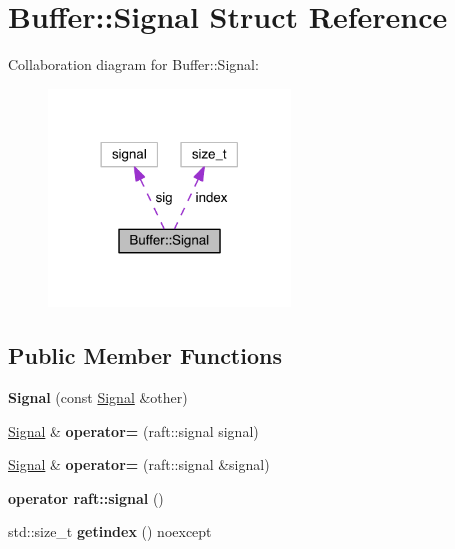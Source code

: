 \hypertarget{struct_buffer_1_1_signal}{}\section{Buffer\+:\+:Signal Struct Reference}
\label{struct_buffer_1_1_signal}


Collaboration diagram for Buffer\+:\+:Signal\+:
\nopagebreak
\begin{figure}[H]
\begin{center}
\leavevmode
\includegraphics[width=182pt]{struct_buffer_1_1_signal__coll__graph}
\end{center}
\end{figure}
\subsection*{Public Member Functions}
\begin{DoxyCompactItemize}
\item 
\hypertarget{struct_buffer_1_1_signal_a62e5d960ad4d79ac886cb33b05203d4f}{}\label{struct_buffer_1_1_signal_a62e5d960ad4d79ac886cb33b05203d4f} 
{\bfseries Signal} (const \hyperlink{struct_buffer_1_1_signal}{Signal} \&other)
\item 
\hypertarget{struct_buffer_1_1_signal_a512a6d743d0d017dd217c9378aca9a1c}{}\label{struct_buffer_1_1_signal_a512a6d743d0d017dd217c9378aca9a1c} 
\hyperlink{struct_buffer_1_1_signal}{Signal} \& {\bfseries operator=} (raft\+::signal signal)
\item 
\hypertarget{struct_buffer_1_1_signal_a5e038224cf5db4c03e093a0dc0e137f8}{}\label{struct_buffer_1_1_signal_a5e038224cf5db4c03e093a0dc0e137f8} 
\hyperlink{struct_buffer_1_1_signal}{Signal} \& {\bfseries operator=} (raft\+::signal \&signal)
\item 
\hypertarget{struct_buffer_1_1_signal_ac89eb718b4f68b7d581918c31992ac7f}{}\label{struct_buffer_1_1_signal_ac89eb718b4f68b7d581918c31992ac7f} 
{\bfseries operator raft\+::signal} ()
\item 
\hypertarget{struct_buffer_1_1_signal_a8e10259332c55e33b67b5174bfe0d59f}{}\label{struct_buffer_1_1_signal_a8e10259332c55e33b67b5174bfe0d59f} 
std\+::size\+\_\+t {\bfseries getindex} () noexcept
\end{DoxyCompactItemize}
